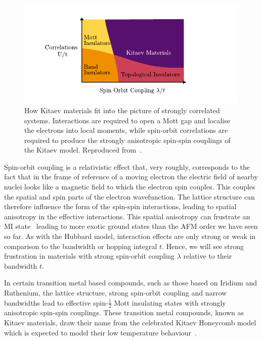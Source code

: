 \hypertarget{fig:kitaev-material-phase-diagram}{%
\begin{figure}
\centering
\includegraphics[width=1\textwidth,height=\textheight]{figure_code/intro_chapter/kitaev_material_phase_diagram}
\caption[{Phase Diagram}]{How Kitaev materials fit into the picture of strongly correlated systems. Interactions are required to open a Mott gap and localise the electrons into local moments, while spin-orbit correlations are required to produce the strongly anisotropic spin-spin couplings of the Kitaev model. Reproduced from~\autocite{TrebstPhysRep2022}.}
\label{fig:kitaev-material-phase-diagram}
\end{figure}
}

Spin-orbit coupling is a relativistic effect that, very roughly, corresponds to the fact that in the frame of reference of a moving electron the electric field of nearby nuclei looks like a magnetic field to which the electron spin couples. This couples the spatial and spin parts of the electron wavefunction. The lattice structure can therefore influence the form of the spin-spin interactions, leading to spatial anisotropy in the effective interactions. This spatial anisotropy can frustrate an MI state~\autocite{jackeliMottInsulatorsStrong2009,khaliullinOrbitalOrderFluctuations2005} leading to more exotic ground states than the AFM order we have seen so far. As with the Hubbard model, interaction effects are only strong or weak in comparison to the bandwidth or hopping integral \(t\). Hence, we will see strong frustration in materials with strong spin-orbit coupling \(\lambda\) relative to their bandwidth \(t\).

In certain transition metal based compounds, such as those based on Iridium and Ruthenium, the lattice structure, strong spin-orbit coupling and narrow bandwidths lead to effective spin-\(\tfrac{1}{2}\) Mott insulating states with strongly anisotropic spin-spin couplings. These transition metal compounds, known as Kitaev materials, draw their name from the celebrated Kitaev Honeycomb model which is expected to model their low temperature behaviour~\autocite{Jackeli2009,HerrmannsAnRev2018,Winter2017,TrebstPhysRep2022,Takagi2019}.

